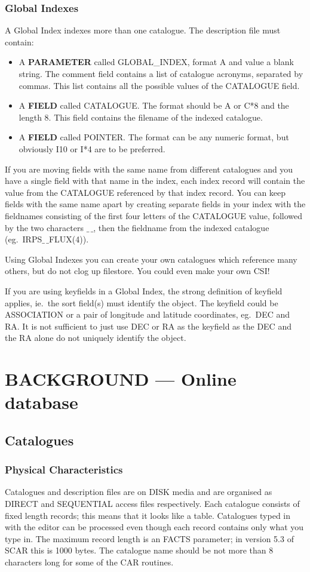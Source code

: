 \subsubsection {Global Indexes}
A Global Index indexes more than one catalogue.
The description file must contain:
\begin{itemize}
\item A {\bf PARAMETER} called GLOBAL\_INDEX, format A and value a blank string.
The comment field contains a list of catalogue acronyms, separated by commas.
This list contains all the possible values of the CATALOGUE field.
\item A {\bf FIELD} called CATALOGUE.
The format should be A or C*8 and the length 8.
This field contains the filename of the indexed catalogue.
\item A {\bf FIELD} called POINTER.
The format can be any numeric format, but obviously I10 or I*4 are to be
preferred.
\end{itemize}
If you are moving fields with the same name from different catalogues and you
have a single field with that name in the index, each index record will contain
the value from the CATALOGUE referenced by that index record.
You can keep fields with the same name apart by creating separate fields in your
index with the fieldnames consisting of the first four letters of the
CATALOGUE value, followed by the two characters $\_\,\_$, then the fieldname 
from the indexed catalogue (eg.\ IRPS$\_\,\_$FLUX(4)).

Using Global Indexes you can create your own catalogues which reference many
others, but do not clog up filestore.
You could even make your own CSI!

If you are using keyfields in a Global Index, the strong definition of keyfield
applies, ie.\ the sort field(s) must identify the object.
The keyfield could be ASSOCIATION or a pair of longitude and latitude
coordinates, eg.\ DEC and RA.
It is not sufficient to just use DEC or RA as the keyfield as the DEC and the
RA alone do not uniquely identify the object.


\section {BACKGROUND --- Online database}

\subsection {Catalogues}
\subsubsection {Physical Characteristics}
Catalogues and description files are on DISK media and are organised as DIRECT
and SEQUENTIAL access files respectively.
Each catalogue consists of fixed length records; this means that it
looks like a table.
Catalogues typed in with the editor can be processed even though each record
contains only what you type in.
The maximum record length is an FACTS parameter; in version 5.3 of SCAR this is
1000 bytes.
The catalogue name should be not more than 8 characters long for
some of the CAR routines.

